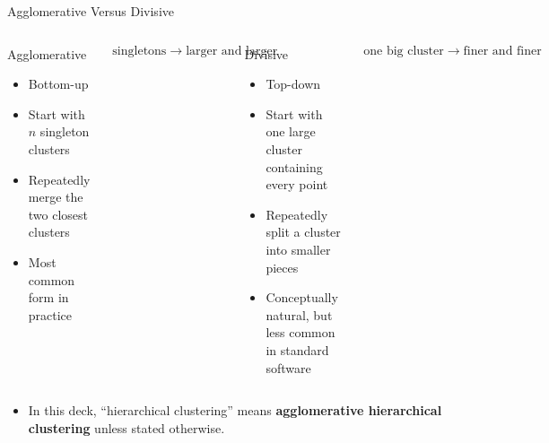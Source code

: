 \documentclass[aspectratio=169,11pt]{beamer}
\begin{document}
\begin{frame}[t]{Agglomerative Versus Divisive}
  \begin{columns}[T,totalwidth=\textwidth]
      \begin{block}{Agglomerative}
        \begin{itemize}
          \item Bottom-up
          \item Start with $n$ singleton clusters
          \item Repeatedly merge the two closest clusters
          \item Most common form in practice
        \end{itemize}
      \end{block}

      \[
        \text{singletons}
        \;\longrightarrow\;
        \text{larger and larger groups}
      \]
      \begin{block}{Divisive}
        \begin{itemize}
          \item Top-down
          \item Start with one large cluster containing every point
          \item Repeatedly split a cluster into smaller pieces
          \item Conceptually natural, but less common in standard software
        \end{itemize}
      \end{block}

      \[
        \text{one big cluster}
        \;\longrightarrow\;
        \text{finer and finer groups}
      \]
  \end{columns}

  \vspace{0.35em}
  \begin{itemize}
    \item In this deck, ``hierarchical clustering'' means \textbf{agglomerative hierarchical clustering} unless stated otherwise.
  \end{itemize}
\end{frame}
\end{document}
